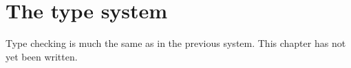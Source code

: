 \chapter{The type system}
\label{types}
Type checking is much the same as in the previous system.  This
chapter has not yet been written.
